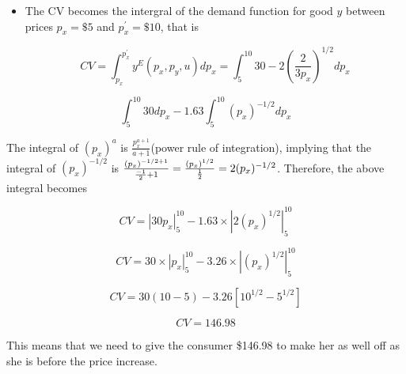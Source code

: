 \documentclass{article}
\begin{document}
\begin{enumerate}
\begin{itemize}
\item The CV becomes the intergral of the demand function for good $y$
between prices $p_{x}=\$5$ and $p_{x}^{\prime }=\$10$, that is 

\[
CV=\int_{p_{x}}^{p_{x}^{\prime
}}y^{E}(p_{x},p_{y},u)dp_{x}=\int_{5}^{10}30-2\left( \frac{2}{3p_{x}}\right)
^{1/2}dp_{x}
\]
\end{itemize}

\[
\int_{5}^{10}30dp_{x}-1.63\int_{5}^{10}\left( p_{x}\right) ^{-1/2}dp_{x}
\]

The integral of $(p_{x})^{a}$ is $\frac{p_{x}^{a+1}}{a+1}$(power rule of
integration), implying that the integral of $(p_{x})^{-1/2}$ is $\frac{%
(p_{x})^{-1/2+1}}{\frac{-1}{2}+1}=\frac{(p_{x})^{1/2}}{\frac{1}{2}}%
=2(p_{x})^{-1/2}$. Therefore, the above integral becomes

\[
CV=|30p_{x}|_{5}^{10}-1.63\times |2(p_{x})^{1/2}|_{5}^{10}
\]

\[
CV=30\times |p_{x}|_{5}^{10}-3.26\times |(p_{x})^{1/2}|_{5}^{10}
\]

\[
CV=30(10-5)-3.26[10^{1/2}-5^{1/2}]
\]

\[
CV=146.98
\]

This means that we need to give the consumer \$146.98 to make her as well
off as she is before the price increase.
\end{enumerate}
\end{document}
